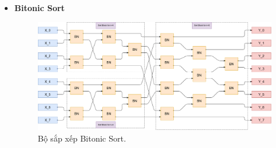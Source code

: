 \begin{itemize}[label=-]
	\item \textbf{Bitonic Sort}
	
	\begin{figure}[H]
		\centering
		\includegraphics[width=\linewidth]{./my-chapters/my-diagrams/Question6/debai.png}
		\caption{Bộ sắp xếp Bitonic Sort.}
	\end{figure}
\end{itemize}
















